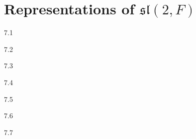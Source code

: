 \chapter{Representations of \texorpdfstring{$ \mathfrak{sl}(2, F) $}{ sl(2,F)}}

\begin{solution}{}{7.1}
    
\end{solution}

\begin{solution}{}{7.2}

\end{solution}

\begin{solution}{}{7.3}
    
\end{solution}

\begin{solution}{}{7.4}

\end{solution}

\begin{solution}{}{7.5}
    
\end{solution}

\begin{solution}{}{7.6}

\end{solution}

\begin{solution}{}{7.7}
    
\end{solution}
